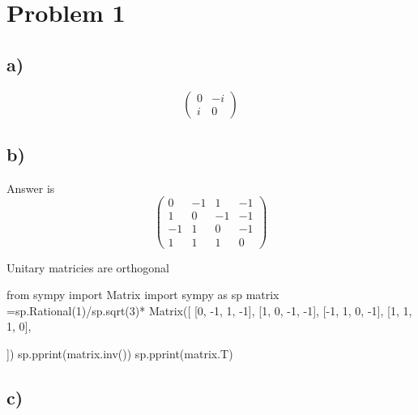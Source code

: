 \documentclass[]{article}
\newenvironment{Shaded}{\begin{snugshade}}{\end{snugshade}}
\newcommand{\NormalTok}[1]{#1}
\begin{document}

\hypertarget{problem-1}{%
\section{Problem 1}\label{problem-1}}

\hypertarget{a}{%
\subsection{a)}\label{a}}

\[
\begin{pmatrix}
0 & -i \\
i & 0
\end{pmatrix}
\]

\hypertarget{b}{%
\subsection{b)}\label{b}}

Answer is \[
\begin{pmatrix}
0 & -1 & 1 & -1 \\
1 & 0 & -1 & -1 \\
-1 & 1 & 0 & -1 \\
1 & 1 & 1 & 0
\end{pmatrix}
\]

Unitary matricies are orthogonal

\begin{Shaded}
\begin{Highlighting}[]
\NormalTok{from sympy import Matrix}
\NormalTok{import sympy as sp}
\NormalTok{matrix =sp.Rational(1)/sp.sqrt(3)* Matrix([}
\NormalTok{    [0, {-}1, 1, {-}1],}
\NormalTok{    [1, 0, {-}1, {-}1],}
\NormalTok{    [{-}1, 1, 0, {-}1],}
\NormalTok{    [1, 1, 1, 0],}

\NormalTok{])}
\NormalTok{sp.pprint(matrix.inv())}
\NormalTok{sp.pprint(matrix.T)}
\end{Highlighting}
\end{Shaded}

\hypertarget{c}{%
\subsection{c)}\label{c}}
\end{document}
